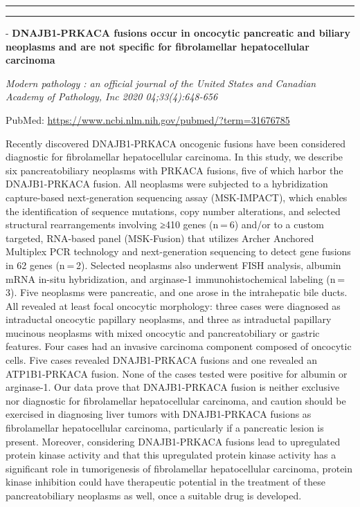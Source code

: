 \documentclass[
]{article}
\begin{document}
\begin{center}\rule{0.5\linewidth}{0.5pt}\end{center}

\begin{center}\rule{0.5\linewidth}{0.5pt}\end{center}

- \textbf{DNAJB1-PRKACA fusions occur in oncocytic pancreatic and
biliary neoplasms and are not specific for fibrolamellar hepatocellular
carcinoma}

\emph{Modern pathology : an official journal of the United States and
Canadian Academy of Pathology, Inc 2020 04;33(4):648-656}

PubMed: \url{https://www.ncbi.nlm.nih.gov/pubmed/?term=31676785}

Recently discovered DNAJB1-PRKACA oncogenic fusions have been considered
diagnostic for fibrolamellar hepatocellular carcinoma. In this study, we
describe six pancreatobiliary neoplasms with PRKACA fusions, five of
which harbor the DNAJB1-PRKACA fusion. All neoplasms were subjected to a
hybridization capture-based next-generation sequencing assay
(MSK-IMPACT), which enables the identification of sequence mutations,
copy number alterations, and selected structural rearrangements
involving ≥410 genes (n = 6) and/or to a custom targeted, RNA-based
panel (MSK-Fusion) that utilizes Archer Anchored Multiplex PCR
technology and next-generation sequencing to detect gene fusions in 62
genes (n = 2). Selected neoplasms also underwent FISH analysis, albumin
mRNA in-situ hybridization, and arginase-1 immunohistochemical labeling
(n = 3). Five neoplasms were pancreatic, and one arose in the
intrahepatic bile ducts. All revealed at least focal oncocytic
morphology: three cases were diagnosed as intraductal oncocytic
papillary neoplasms, and three as intraductal papillary mucinous
neoplasms with mixed oncocytic and pancreatobiliary or gastric features.
Four cases had an invasive carcinoma component composed of oncocytic
cells. Five cases revealed DNAJB1-PRKACA fusions and one revealed an
ATP1B1-PRKACA fusion. None of the cases tested were positive for albumin
or arginase-1. Our data prove that DNAJB1-PRKACA fusion is neither
exclusive nor diagnostic for fibrolamellar hepatocellular carcinoma, and
caution should be exercised in diagnosing liver tumors with
DNAJB1-PRKACA fusions as fibrolamellar hepatocellular carcinoma,
particularly if a pancreatic lesion is present. Moreover, considering
DNAJB1-PRKACA fusions lead to upregulated protein kinase activity and
that this upregulated protein kinase activity has a significant role in
tumorigenesis of fibrolamellar hepatocellular carcinoma, protein kinase
inhibition could have therapeutic potential in the treatment of these
pancreatobiliary neoplasms as well, once a suitable drug is developed.
\end{document}
